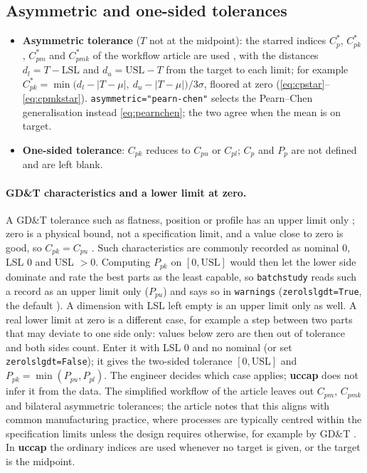 \documentclass[a4paper,11pt,oneside,openany,parskip=half-,headings=standardclasses,toc=flat,numbers=noenddot]{scrbook}
\newcommand{\code}[1]{\texttt{\begingroup\def\_{\textunderscore\allowbreak}#1\endgroup}}
\newcommand{\pkg}{\textsf{\bfseries uccap}}
\begin{document}
\subsection{Asymmetric and one-sided tolerances}\label{sec:asym}
\begin{itemize}
\item \textbf{Asymmetric tolerance} ($T$ not at the midpoint): the starred indices $C_p^{*}$, $C_{pk}^{*}$,
  $C_{pm}^{*}$ and $C_{pmk}^{*}$ of the workflow article are used \cite[Eqs.~(3), (5), (9), (13)]{jy-workflow}, with
  the distances $d_l = T-\mathrm{LSL}$ and $d_u = \mathrm{USL}-T$ from the target to each limit; for example
  $C_{pk}^* = \min\bigl(d_l - |T-\mu|,\ d_u - |T-\mu|\bigr)/3\sigma$, floored at zero (\eqref{eq:cpstar}--\eqref{eq:cpmkstar}).
  \code{asymmetric="pearn-chen"} selects the Pearn--Chen generalisation \cite{pearn-chen} instead
  \eqref{eq:pearnchen}; the two agree when the mean is on target.
\item \textbf{One-sided tolerance}: $C_{pk}$ reduces to $C_{pu}$ or $C_{pl}$; $C_p$ and $P_p$ are not
  defined and are left blank.
\end{itemize}

\paragraph{GD\&T characteristics and a lower limit at zero.} A GD\&T tolerance such as flatness, position or
profile has an upper limit only \cite[Sec.~3.1.3]{jy-workflow}; zero is a physical bound, not a specification
limit, and a value close to zero is good, so $C_{pk} = C_{pu}$ \cite[Eq.~(6)]{jy-workflow}. Such characteristics are commonly recorded as nominal 0, LSL 0 and USL $> 0$. Computing $P_{pk}$ on
$[0, \mathrm{USL}]$ would then let the lower side dominate and rate the best parts as the least capable, so
\code{batch\_study} reads such a record as an upper limit only ($P_{pu}$) and says so in \code{warnings}
(\code{zero\_lsl\_gdt=True}, the default%
). A dimension with LSL left empty is
an upper limit only as well. A real lower limit at zero is a different case, for example a step between two
parts that may deviate to one side only: values below zero are then out of tolerance and both sides count. Enter
it with LSL 0 and no nominal (or set \code{zero\_lsl\_gdt=False}); it gives the two-sided tolerance
$[0, \mathrm{USL}]$ and $P_{pk} = \min(P_{pu}, P_{pl})$. The engineer decides which case applies; \pkg{} does not
infer it from the data.
The simplified workflow of the article leaves out $C_{pm}$, $C_{pmk}$ and bilateral asymmetric tolerances; the
article notes that this aligns with common manufacturing practice, where processes are typically centred within
the specification limits unless the design requires otherwise, for example by GD\&T \cite[Sec.~7]{jy-workflow}. In \pkg{} the
ordinary indices are used whenever no target is given, or the target is the midpoint.
\end{document}
